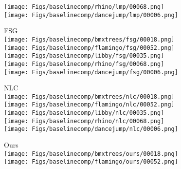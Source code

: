 \documentclass[runningheads]{llncs}
\newlength\figwidth
\newlength\figmarginv
\newlength\figmargin
\begin{document}
\begin{figure*}[t]
\begin{center}
\begin{subfigure}[b]{\figwidth}
\texttt{[image: Figs/baselinecomp/rhino/lmp/00068.png]} \\
			\texttt{[image: Figs/baselinecomp/dancejump/lmp/00006.png]} \\
\end{subfigure}\hfill
		\begin{subfigure}[b]{\figwidth}\centering FSG~\cite{jain2017fusionseg} \vspace{\figmarginv} \\
			\vspace{-0.1cm}
			\texttt{[image: Figs/baselinecomp/bmxtrees/fsg/00018.png]} \\
			\texttt{[image: Figs/baselinecomp/flamingo/fsg/00052.png]} \\
			\texttt{[image: Figs/baselinecomp/libby/fsg/00035.png]} \\
\texttt{[image: Figs/baselinecomp/rhino/fsg/00068.png]} \\
			 \texttt{[image: Figs/baselinecomp/dancejump/fsg/00006.png]} \\
\end{subfigure}\hfill
		\begin{subfigure}[b]{\figwidth}\centering NLC~\cite{FaktorBMVC14} \vspace{\figmarginv} \\
			\vspace{-0.1cm}
			\texttt{[image: Figs/baselinecomp/bmxtrees/nlc/00018.png]} \\
			\texttt{[image: Figs/baselinecomp/flamingo/nlc/00052.png]} \\
			\texttt{[image: Figs/baselinecomp/libby/nlc/00035.png]} \\
\texttt{[image: Figs/baselinecomp/rhino/nlc/00068.png]} \\
		 \texttt{[image: Figs/baselinecomp/dancejump/nlc/00006.png]} \\
\end{subfigure}\hfill
		\begin{subfigure}[b]{\figwidth}\centering Ours \vspace{\figmarginv} \\
			\vspace{-0.1cm}
			\texttt{[image: Figs/baselinecomp/bmxtrees/ours/00018.png]} \\
			\texttt{[image: Figs/baselinecomp/flamingo/ours/00052.png]} \\

\end{subfigure}
\end{center}
\end{figure*}
\end{document}
